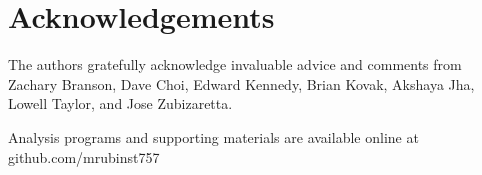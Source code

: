 \documentclass[aoas]{imsart}
\theoremstyle{plain}
\theoremstyle{remark}
\begin{document}
\section*{Acknowledgements}

The authors gratefully acknowledge invaluable advice and comments from Zachary Branson, Dave Choi, Edward Kennedy, Brian Kovak, Akshaya Jha, Lowell Taylor, and Jose Zubizaretta.

\begin{supplement}
Analysis programs and supporting materials are available online at github.com/mrubinst757
\end{supplement}



\end{document}
